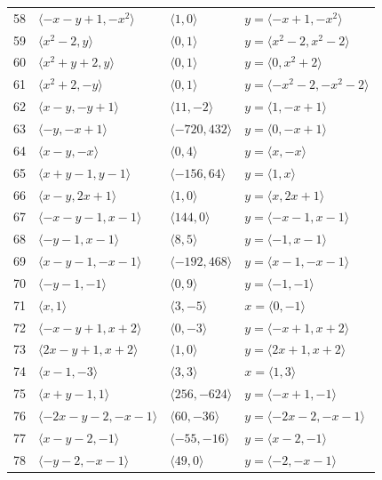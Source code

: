 \documentclass[11pt]{article}
\begin{document}
\begin{longtable}{@{}rlll@{}}
58 & $\langle -x-y+1,-x^{2}\rangle$ & $\langle 1,0\rangle$ & $y=\langle -x+1,-x^{2}\rangle$\\
59 & $\langle x^{2}-2,y\rangle$ & $\langle 0,1\rangle$ & $y=\langle x^{2}-2,x^{2}-2\rangle$\\
60 & $\langle x^{2}+y+2,y\rangle$ & $\langle 0,1\rangle$ & $y=\langle 0,x^{2}+2\rangle$\\
61 & $\langle x^{2}+2,-y\rangle$ & $\langle 0,1\rangle$ & $y=\langle -x^{2}-2,-x^{2}-2\rangle$\\
62 & $\langle x-y,-y+1\rangle$ & $\langle 11,-2\rangle$ & $y=\langle 1,-x+1\rangle$\\
63 & $\langle -y,-x+1\rangle$ & $\langle -720,432\rangle$ & $y=\langle 0,-x+1\rangle$\\
64 & $\langle x-y,-x\rangle$ & $\langle 0,4\rangle$ & $y=\langle x,-x\rangle$\\
65 & $\langle x+y-1,y-1\rangle$ & $\langle -156,64\rangle$ & $y=\langle 1,x\rangle$\\
66 & $\langle x-y,2x+1\rangle$ & $\langle 1,0\rangle$ & $y=\langle x,2x+1\rangle$\\
67 & $\langle -x-y-1,x-1\rangle$ & $\langle 144,0\rangle$ & $y=\langle -x-1,x-1\rangle$\\
68 & $\langle -y-1,x-1\rangle$ & $\langle 8,5\rangle$ & $y=\langle -1,x-1\rangle$\\
69 & $\langle x-y-1,-x-1\rangle$ & $\langle -192,468\rangle$ & $y=\langle x-1,-x-1\rangle$\\
70 & $\langle -y-1,-1\rangle$ & $\langle 0,9\rangle$ & $y=\langle -1,-1\rangle$\\
71 & $\langle x,1\rangle$ & $\langle 3,-5\rangle$ & $x=\langle 0,-1\rangle$\\
72 & $\langle -x-y+1,x+2\rangle$ & $\langle 0,-3\rangle$ & $y=\langle -x+1,x+2\rangle$\\
73 & $\langle 2x-y+1,x+2\rangle$ & $\langle 1,0\rangle$ & $y=\langle 2x+1,x+2\rangle$\\
74 & $\langle x-1,-3\rangle$ & $\langle 3,3\rangle$ & $x=\langle 1,3\rangle$\\
75 & $\langle x+y-1,1\rangle$ & $\langle 256,-624\rangle$ & $y=\langle -x+1,-1\rangle$\\
76 & $\langle -2x-y-2,-x-1\rangle$ & $\langle 60,-36\rangle$ & $y=\langle -2x-2,-x-1\rangle$\\
77 & $\langle x-y-2,-1\rangle$ & $\langle -55,-16\rangle$ & $y=\langle x-2,-1\rangle$\\
78 & $\langle -y-2,-x-1\rangle$ & $\langle 49,0\rangle$ & $y=\langle -2,-x-1\rangle$\\

\end{longtable}
\end{document}
